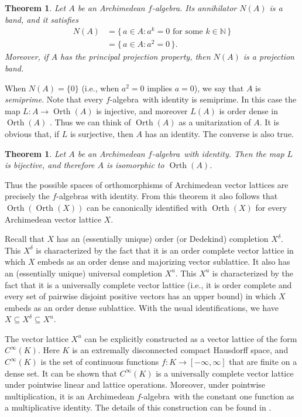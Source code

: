 \documentclass{memo-l}
\newtheorem{thm}[theorem]{Theorem}
\theoremstyle{definition}
\theoremstyle{remark}
\numberwithin{section}{chapter}
\numberwithin{equation}{chapter}
\newcommand\N{\ensuremath{\mathbb{N}}}
\newcommand{\falg}{$f\!$-algebra}
\newcommand{\orth}[1]{\operatorname{Orth}(#1)}
\begin{document}
\begin{thm}
    Let $A$ be an Archimedean \falg. Its annihilator $N(A)$ is a band,
    and it satisfies
    \begin{align*}
        N(A)&=\{\, a \in A : a^{k}=0\text{ for some }k \in \N \, \}\\
            &=\{\, a \in A : a^2=0 \, \}.
    \end{align*}
    Moreover, if $A$ has the principal projection property, then
    $N(A)$ is a projection band.
\end{thm}

When $N(A)=\{0\}$ (i.e., when $a^2=0$ implies $a=0$), we say that $A$
is \emph{semiprime}. Note that every \falg\ with identity is
semiprime. In this case the map $L\colon A\to \orth A$ is
injective, and moreover $L(A)$ is order dense in $\orth A$
\cite[Proposition 2.1]{huijsmans_depagter1984_bidual}. Thus we can think of $\orth A$
as a unitarization of $A$. It is obvious that, if $L$ is surjective,
then $A$ has an identity. The converse is also true.

\begin{thm}
    Let $A$ be an Archimedean \falg\ with identity. Then the map $L$
    is bijective, and therefore $A$ is isomorphic to $\orth A$.
\end{thm}

Thus the possible spaces of orthomorphisms of Archimedean
vector lattices are precisely the \falg s with identity. From this
theorem it also follows that $\orth{\orth X}$ can be
canonically identified with $\orth X$ for every Archimedean vector lattice $X$.

Recall that $X$ has an (essentially unique) order (or Dedekind)
completion $X^{\delta }$. This $X^{\delta }$ is characterized by the
fact that it is an order complete vector lattice in which $X$ embeds
as an order dense and majorizing vector sublattice. It also has an
(essentially unique) universal completion $X^{u}$. This $X^{u}$ is
characterized by the fact that it is a universally complete vector
lattice (i.e., it is
order complete and every set of pairwise disjoint positive vectors
has an upper bound) in which $X$ embeds as an order dense sublattice.
With the usual identifications, we have $X\subseteq X^{\delta
}\subseteq X^{u}$.

The vector lattice $X^{u}$ can be explicitly constructed as a vector
lattice of the form $C^{\infty }(K)$. Here $K$ is an extremally
disconnected compact Hausdorff space, and $C^{\infty }(K)$ is the set
of continuous functions $f\colon K\to [-\infty ,\infty ]$ that are
finite on a dense set. It can be shown that $C^{\infty }(K)$ is a
universally complete vector lattice under pointwise linear and lattice
operations. Moreover, under pointwise multiplication, it is an
Archimedean \falg\ with the constant one function as a multiplicative
identity. The details of this construction can be found in \cite[Section 50]{luxemburg_zaanen1971}.
\end{document}
